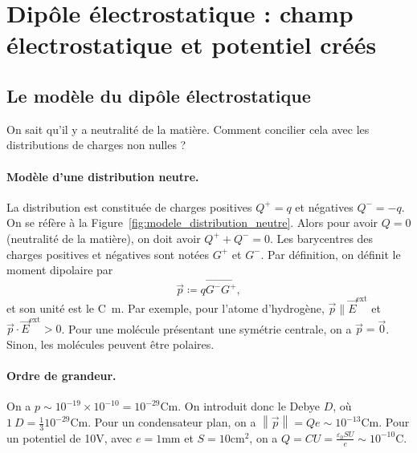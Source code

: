 \section[Dipôle électrostatique: E et V créés]{Dipôle électrostatique : champ électrostatique et potentiel créés}

\subsection{Le modèle du dipôle électrostatique}

On sait qu'il y a neutralité de la matière. Comment concilier cela avec les distributions de charges non nulles ?

\paragraph{Modèle d'une distribution neutre.} La distribution est constituée de charges positives $Q^{+}=q$ et négatives $Q^{-}=-q$. On se réfère à la Figure~\ref{fig:modele_distribution_neutre}. Alors pour avoir $Q=0$ (neutralité de la matière), on doit avoir $Q^{+}+Q^{-}=0$. Les barycentres des charges positives et négatives sont notées $G^{+}$ et $G^{-}$. Par définition, on définit le moment dipolaire par
\begin{equation}
    \boxed{
        \vec{p}\coloneqq q\overrightarrow{G^{-}G^{+}},
    }
\end{equation}
et son unité est le \si{\coulomb\metre}. Par exemple, pour l'atome d'hydrogène, $\vec{p}\parallel \vec{E}^{\text{ext}}$ et $\vec{p}\cdot\vec{E}^{\text{ext}}>0$. Pour une molécule présentant une symétrie centrale, on a $\vec{p}=\vec{0}$. Sinon, les molécules peuvent être polaires.

\paragraph{Ordre de grandeur.} On a $p\sim10^{-19}\times10^{-10}=10^{-29}\si{\coulomb\metre}$. On introduit donc le Debye $D$, où $1~D=\frac{1}{3}10^{-29}\si{\coulomb\metre}$. Pour un condensateur plan, on a $\left\lVert\vec{p}\right\rVert=Qe\sim10^{-13}\si{\coulomb\metre}$. Pour un potentiel de 10$\si{\volt}$, avec $e=1\si{\milli\metre}$ et $S=10\si{\centi\metre\squared}$, on a $Q=CU=\frac{\varepsilon_{0}SU}{e}\sim10^{-10}\si{\coulomb}$.

